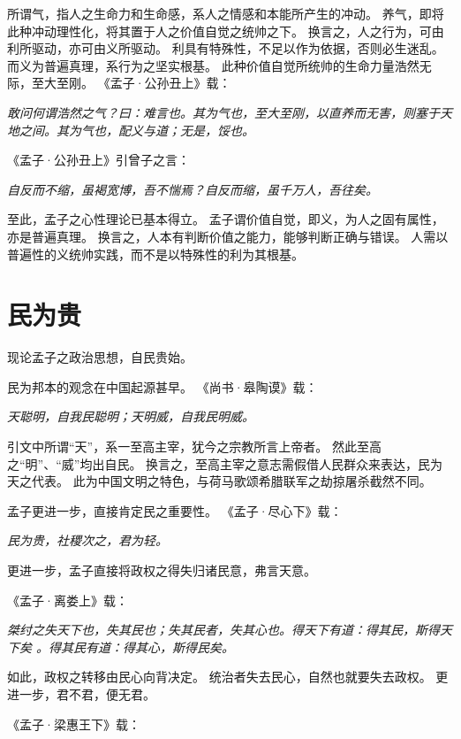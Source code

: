 \documentclass[11pt]{article}
\begin{document}
\par

所谓气，指人之生命力和生命感，系人之情感和本能所产生的冲动。
养气，即将此种冲动理性化，将其置于人之价值自觉之统帅之下。
换言之，人之行为，可由利所驱动，亦可由义所驱动。
利具有特殊性，不足以作为依据，否则必生迷乱。
而义为普遍真理，系行为之坚实根基。
此种价值自觉所统帅的生命力量浩然无际，至大至刚。
《孟子·公孙丑上》载：

\textit{敢问何谓浩然之气？曰：难言也。其为气也，至大至刚，以直养而无害，则塞于天地之间。其为气也，配义与道；无是，馁也。}

《孟子·公孙丑上》引曾子之言：

\textit{自反而不缩，虽褐宽博，吾不惴焉？自反而缩，虽千万人，吾往矣。}

\par

至此，孟子之心性理论已基本得立。
孟子谓价值自觉，即义，为人之固有属性，亦是普遍真理。
换言之，人本有判断价值之能力，能够判断正确与错误。
人需以普遍性的义统帅实践，而不是以特殊性的利为其根基。
  
\section{民为贵}
现论孟子之政治思想，自民贵始。

\par

民为邦本的观念在中国起源甚早。
《尚书·皋陶谟》载：
  
\textit{天聪明，自我民聪明；天明威，自我民明威。}

引文中所谓“天”，系一至高主宰，犹今之宗教所言上帝者。
然此至高之“明”、“威”均出自民。
换言之，至高主宰之意志需假借人民群众来表达，民为天之代表。
此为中国文明之特色，与荷马歌颂希腊联军之劫掠屠杀截然不同。

\par

孟子更进一步，直接肯定民之重要性。
《孟子·尽心下》载：

\textit{民为贵，社稷次之，君为轻。}

更进一步，孟子直接将政权之得失归诸民意，弗言天意。

《孟子·离娄上》载：

\textit{桀纣之失天下也，失其民也；失其民者，失其心也。得天下有道：得其民，斯得天下矣 。得其民有道：得其心，斯得民矣。}

如此，政权之转移由民心向背决定。
统治者失去民心，自然也就要失去政权。
更进一步，君不君，便无君。

《孟子·梁惠王下》载：
  
\end{document}
